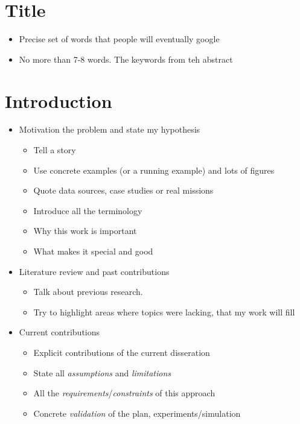 

\chapter{Title}
\begin{itemize}
    \item Precise set of words that people will eventually google
    \item No more than 7-8 words. The keywords from teh abstract
\end{itemize}

\chapter{Introduction}

\begin{itemize}
    \item Motivation the problem and state my hypothesis
        \begin{itemize}
            \item Tell a story
            \item Use concrete examples (or a running example) and lots of figures
            \item Quote data sources, case studies or real missions
            \item Introduce all the terminology
            \item Why this work is important
            \item What makes it special and good
        \end{itemize}
    \item Literature review and past contributions
        \begin{itemize}
            \item Talk about previous research.
            \item Try to highlight areas where topics were lacking, that my work will fill
        \end{itemize}
    \item Current contributions
        \begin{itemize}
            \item Explicit contributions of the current disseration
            \item State all \emph{assumptions} and \emph{limitations}
            \item All the \emph{requirements}/\emph{constraints} of this approach
            \item Concrete \emph{validation} of the plan, experiments/simulation

\end{itemize}
\end{itemize}
